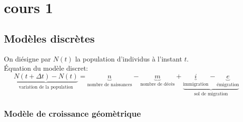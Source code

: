 \chapter{cours 1}
\section{Modèles discrètes}
On diésigne par $N(t)$ la population d'individus à l'instant  $t$.\\
Équation du modèle discret:
 \[
     \underbrace{N(t + \Delta t) - N(t)}_{\text{variation de la population}} = \underbrace{n}_{\text{nombre de naissances}} - \underbrace{m}_{\text{nombre de décès}} + \underbrace{ \underbrace{i}_{\text{immigration}} - \underbrace{e}_{\text{émigration}} }_{\text{sol de migration}}
\] 
\subsection{Modèle de croissance géomètrique}
